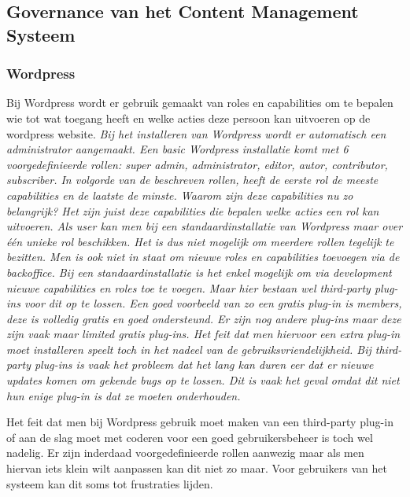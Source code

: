 \subsection{Governance van het Content Management Systeem}
\subsubsection{Wordpress}
Bij Wordpress wordt er gebruik gemaakt van roles en capabilities om te bepalen wie tot wat toegang heeft en welke acties deze persoon kan uitvoeren op de wordpress website. \textit{Bij het installeren van Wordpress wordt er automatisch een administrator aangemaakt. Een basic Wordpress installatie komt met 6 voorgedefinieerde rollen: super admin, administrator, editor, autor, contributor, subscriber. In volgorde van de beschreven rollen, heeft de eerste rol de meeste capabilities en de laatste de minste. Waarom zijn deze capabilities nu zo belangrijk? Het zijn juist deze capabilities die bepalen welke acties een rol kan uitvoeren. Als user kan men bij een standaardinstallatie van Wordpress maar over één unieke rol beschikken. Het is dus niet mogelijk om meerdere rollen tegelijk te bezitten. Men is ook niet in staat om nieuwe roles en capabilities toevoegen via de backoffice. Bij een standaardinstallatie is het enkel mogelijk om via development nieuwe capabilities en roles toe te voegen. Maar hier bestaan wel third-party plug-ins voor dit op te lossen. Een goed voorbeeld van zo een gratis plug-in is members, deze is volledig gratis en goed ondersteund. Er zijn nog andere plug-ins maar deze zijn vaak maar limited gratis plug-ins. Het feit dat men hiervoor een extra plug-in moet installeren speelt toch in het nadeel van de gebruiksvriendelijkheid. Bij third-party plug-ins is vaak het probleem dat het lang kan duren eer dat er nieuwe updates komen om gekende bugs op te lossen. Dit is vaak het geval omdat dit niet hun enige plug-in is dat ze moeten onderhouden.} \autocite{WordpressCommunity2019}


Het feit dat men bij Wordpress gebruik moet maken van een third-party plug-in of aan de slag moet met coderen voor een goed gebruikersbeheer is toch wel nadelig. Er zijn inderdaad voorgedefinieerde rollen aanwezig maar als men hiervan iets klein wilt aanpassen kan dit niet zo maar. Voor gebruikers van het systeem kan dit soms tot frustraties lijden.

